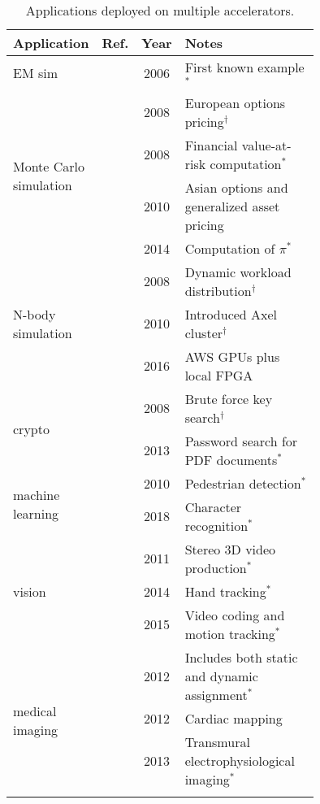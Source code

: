 \begin{table}[htp]
\centering
\caption{Applications deployed on multiple accelerators.}
\label{tbl:apps1}
\vspace{0.1in}
\begin{tabular}{p{0.15\linewidth} | c | c | p{0.6\linewidth}}
Application & Ref. & Year & Notes \\ \hline
EM sim & \cite{kdh+06} & 2006 & First known example$^*$ \\ \hline
\multirow{4}{\linewidth}{Monte Carlo simulation} & \cite{ytt+08} & 2008 & European options pricing$^\dag$  \\ \cline{2-4}
 & \cite{shsc08} & 2008 & Financial value-at-risk computation$^*$  \\ \cline{2-4}
 & \cite{tttl10} & 2010 & Asian options and generalized asset pricing \\ \cline{2-4}
 & \cite{admb14} & 2014 & Computation of $\pi$$^*$ \\ \hline
\multirow{3}{\linewidth}{N-body simulation} & \cite{ytt+08} & 2008 & Dynamic workload distribution$^\dag$ \\ \cline{2-4}
 & \cite{tl10} & 2010 & Introduced Axel cluster$^\dag$ \\ \cline{2-4}
 & \cite{sm16} & 2016 & AWS GPUs plus local FPGA \\ \hline
\multirow{2}{\linewidth}{crypto} & \cite{ytt+08} & 2008 & Brute force key search$^\dag$ \\ \cline{2-4}
 & \cite{dfg+13} & 2013 & Password search for PDF documents$^*$ \\ \hline
\multirow{2}{\linewidth}{machine learning} & \cite{bkdb10} & 2010 & Pedestrian detection$^*$ \\ \cline{2-4}
 & \cite{log+18} & 2018 & Character recognition$^*$ \\ \hline
\multirow{3}{*}{vision} & \cite{ghgb11} & 2011 & Stereo 3D video production$^*$ \\ \cline{2-4}
 & \cite{brf14} & 2014 & Hand tracking$^*$ \\ \cline{2-4}
 & \cite{rpm+15} & 2015 & Video coding and motion tracking$^*$ \\ \hline
\multirow{6}{\linewidth}{medical imaging} & \cite{szb+12} & 2012 & Includes both static and dynamic assignment$^*$ \\ \cline{2-4}
 & \cite{mjk12} & 2012 & Cardiac mapping \\ \cline{2-4}
 & \cite{sll13} & 2013 & Transmural electrophysiological imaging$^*$ \\ \cline{2-4}
$$
\end{tabular}
\end{table}

